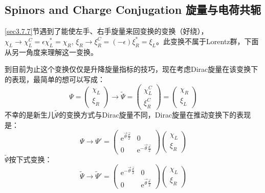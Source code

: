 \subsection[旋量与电荷共轭]{Spinors and Charge Conjugation \quad 旋量与电荷共轭}
\label{sec3.7.10}
\ref{sec3.7.7}节遇到了能使左手、右手旋量来回变换的变换（好绕），$\chi_L \rightarrow \chi_L^C = \epsilon \chi_L^* =  \chi_R$, $\xi_R \rightarrow \xi_R^C = (-\epsilon) \xi_R^* = \xi_L$。此变换不属于Lorentz群，下面从另一角度来理解这一变换。

到目前为止这个变换仅仅是升降旋量指标的技巧，现在考虑Dirac旋量在该变换下的表现，最简单的想可以写成：
\begin{equation}
\label{equ3.233}
    \Psi =
        \begin{pmatrix}
            \chi_L \\ \xi_R
        \end{pmatrix}
    \rightarrow \tilde{\Psi} =
        \begin{pmatrix}
            \chi_L^C \\ \xi_R^C
        \end{pmatrix}
    =
        \begin{pmatrix}
            \chi_R \\ \xi_L
        \end{pmatrix}
\end{equation}
不幸的是新生儿$\tilde{\Psi}$的变换方式与Dirac旋量不同，Dirac旋量在推动变换下的表现是：
\begin{equation}
\label{equ3.234}
    \Psi \rightarrow \Psi' =
        \begin{pmatrix}
            \mathrm{e}^{\vec{\theta} \frac{\vec{\sigma}}{2}} & 0 \\
            0 & \mathrm{e}^{-\vec{\theta} \frac{\vec{\sigma}}{2}}
        \end{pmatrix}
        \begin{pmatrix}
            \chi_L \\ \xi_R
        \end{pmatrix}
\end{equation}
$\tilde{\Psi}$按下式变换：
\begin{equation}
\label{equ3.235}
    \tilde{\Psi} \rightarrow \tilde{\Psi}' =
        \begin{pmatrix}
            \mathrm{e}^{-\vec{\theta} \frac{\vec{\sigma}}{2}} & 0 \\
            0 & \mathrm{e}^{\vec{\theta} \frac{\vec{\sigma}}{2}}
        \end{pmatrix}
        \begin{pmatrix}
            \chi_L \\ \xi_R
        \end{pmatrix}
\end{equation}
